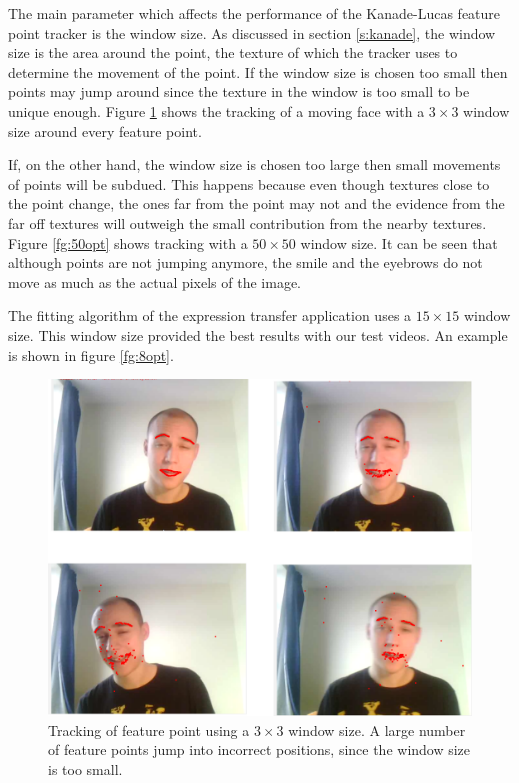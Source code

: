 \documentclass[11pt,a4paper,twoside]{report}
\begin{document}
The main parameter which affects the performance of the Kanade-Lucas feature
point tracker is the window size. As discussed in section \ref{s:kanade}, the
window size is the area around the point, the texture of which the tracker uses
to determine the movement of the point. If the window size is chosen too small
then points may jump around since the texture in the window is too small to be
unique enough. Figure \ref{fg:3opt} shows the tracking of a moving face with
a $3 \times 3$ window size around every feature point.

If, on the other hand, the window size is chosen too large then small movements of
points will be subdued. This happens because even though textures close to the
point change, the ones far from the point may not and the evidence from the far
off textures will outweigh the small contribution from the nearby
textures. Figure \ref{fg:50opt} shows tracking with a $50 \times 50$ window
size. It can be seen that although points are not jumping anymore, the smile and
the eyebrows do not move as much as the actual pixels of the image.

The fitting algorithm of the expression transfer application uses a $15 \times
15$ window size. This window size provided the best results with our test
videos. An example is shown in figure \ref{fg:8opt}.

\begin{figure}[H]
\begin{centering}
\includegraphics[scale=0.33]{images/3x3opt2.png}
\par\end{centering}

\caption{Tracking of feature point using a $3 \times 3$ window size. A large
  number of feature points jump into incorrect positions, since the
  window size is too small.}
\label{fg:3opt}
\end{figure}
\end{document}
